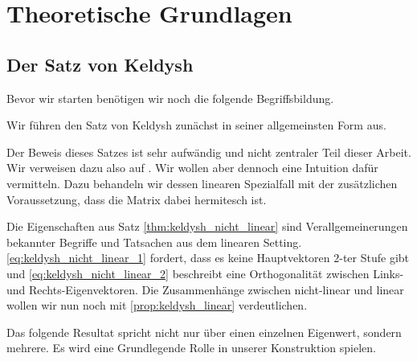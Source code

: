 \chapter{Theoretische Grundlagen}

\section{Der Satz von Keldysh}

Bevor wir starten benötigen wir noch die folgende Begriffsbildung.




Wir führen den Satz von Keldysh zunächst in seiner allgemeinsten Form aus.



Der Beweis dieses Satzes ist sehr aufwändig und nicht zentraler Teil dieser Arbeit.
Wir verweisen dazu also auf \cite{BEYN20123839}.
Wir wollen aber dennoch eine Intuition dafür vermitteln.
Dazu behandeln wir dessen linearen Spezialfall mit der zusätzlichen Voraussetzung, dass die Matrix dabei hermitesch ist.



Die Eigenschaften aus Satz \ref{thm:keldysh_nicht_linear} sind Verallgemeinerungen bekannter Begriffe und Tatsachen aus dem linearen Setting.
\eqref{eq:keldysh_nicht_linear_1} fordert, dass es keine Hauptvektoren $2$-ter Stufe gibt und \eqref{eq:keldysh_nicht_linear_2} beschreibt eine Orthogonalität zwischen Links- und Rechts-Eigenvektoren.
Die Zusammenhänge zwischen nicht-linear und linear wollen wir nun noch mit \ref{prop:keldysh_linear} verdeutlichen.





% 

% 
% 

Das folgende Resultat spricht nicht nur über einen einzelnen Eigenwert, sondern mehrere.
Es wird eine Grundlegende Rolle in unserer Konstruktion spielen.



